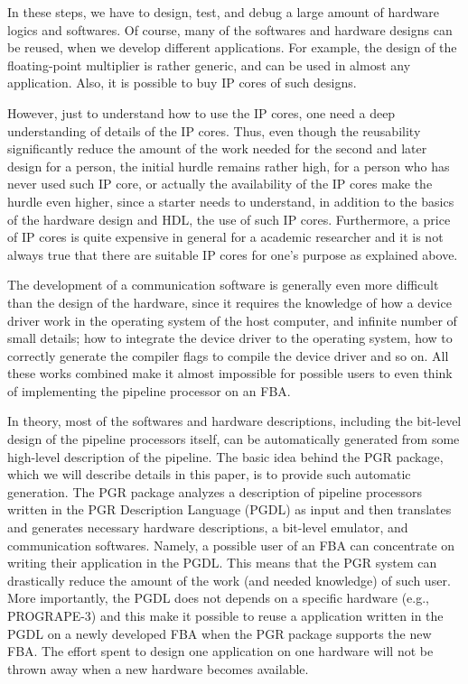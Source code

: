 \documentclass{llncs}
\begin{document}
In these steps, we have to design, test, and debug a large amount of
hardware logics and softwares. Of course, many of the softwares and
hardware designs can be reused, when we develop different
applications. For example, the design of the floating-point multiplier
is rather generic, and can be used in almost any application. Also, it
is possible to buy IP cores of such designs.

However, just to understand how to use the IP cores, one need a deep understanding
of details of the IP cores. Thus, even
though the reusability significantly reduce the amount of the work
needed for the second and later design for a person, the initial
hurdle remains rather high, for a person who has never used 
such IP core, or actually the availability of the IP cores make the hurdle
even higher, since a starter needs to understand, in addition to the
basics of the hardware design and HDL, the use of such IP cores.
Furthermore, a price of IP cores is quite expensive in general for a academic 
researcher and it is not always true that there are suitable IP cores
for one's purpose as explained above.

The development of a communication software is generally even more
difficult than the design of the hardware, since it requires the
knowledge of how a device driver work in the operating
system of the host computer, and infinite number of small details;
how to integrate the device driver to the operating system, how to
correctly generate the compiler flags to compile the device driver and so on.
All these works combined make it almost impossible 
for possible users to even think of implementing the pipeline processor on an FBA.

In theory, most of the softwares and hardware descriptions,
including the bit-level design of the pipeline processors itself,
can be automatically generated from some high-level description of the
pipeline. The basic idea behind the PGR package,
which we will describe details in this paper,
is to provide such automatic generation.
The PGR package analyzes a description of pipeline processors
written in the PGR Description Language (PGDL) as input
and then translates and generates necessary hardware descriptions, 
a bit-level emulator, and communication softwares.
Namely, a possible user of an FBA can concentrate on writing their
application in the PGDL.
This means that the PGR system can drastically reduce the amount of
the work (and needed knowledge) of such user.
More importantly, the PGDL does not depends on a specific hardware
(e.g., PROGRAPE-3) and this make it possible to
reuse a application written in the PGDL on a newly developed FBA
when the PGR package supports the new FBA.
The effort spent to design one application on
one hardware will not be thrown away when a new hardware becomes available.
\end{document}
